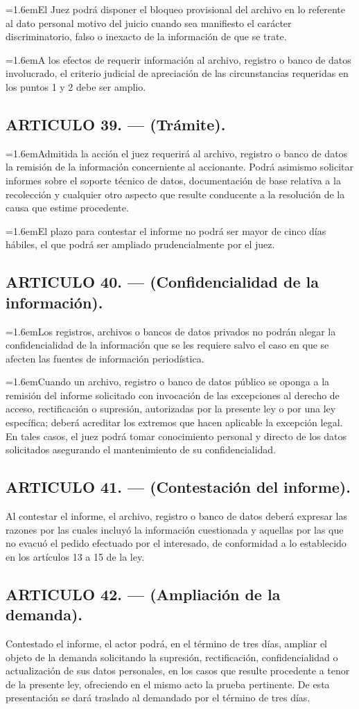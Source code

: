 \documentclass[10pt,a4paper]{article}
\newcommand{\articulo}[1]{\subsection{#1}}
\newcommand{\inciso}[2]{\par{\hangindent=1.6em\hangafter=1\makebox[1.6em][l]{#1}#2\par}}
\begin{document}
\inciso{4.}{El Juez podrá disponer el bloqueo provisional del archivo en lo referente al dato personal motivo del juicio cuando sea manifiesto el carácter discriminatorio, falso o inexacto de la información de que se trate.}

\inciso{5.}{A los efectos de requerir información al archivo, registro o banco de datos involucrado, el criterio judicial de apreciación de las circunstancias requeridas en los puntos 1 y 2 debe ser amplio.}

\articulo{ARTICULO 39. — (Trámite).}
\inciso{1.}{Admitida la acción el juez requerirá al archivo, registro o banco de datos la remisión de la información concerniente al accionante. Podrá asimismo solicitar informes sobre el soporte técnico de datos, documentación de base relativa a la recolección y cualquier otro aspecto que resulte conducente a la resolución de la causa que estime procedente.}

\inciso{2.}{El plazo para contestar el informe no podrá ser mayor de cinco días hábiles, el que podrá ser ampliado prudencialmente por el juez.}

\articulo{ARTICULO 40. — (Confidencialidad de la información).}
\inciso{1.}{Los registros, archivos o bancos de datos privados no podrán alegar la confidencialidad de la información que se les requiere salvo el caso en que se afecten las fuentes de información periodística.}

\inciso{2.}{Cuando un archivo, registro o banco de datos público se oponga a la remisión del informe solicitado con invocación de las excepciones al derecho de acceso, rectificación o supresión, autorizadas por la presente ley o por una ley específica; deberá acreditar los extremos que hacen aplicable la excepción legal. En tales casos, el juez podrá tomar conocimiento personal y directo de los datos solicitados asegurando el mantenimiento de su confidencialidad.}

\articulo{ARTICULO 41. — (Contestación del informe).}
Al contestar el informe, el archivo, registro o banco de datos deberá expresar las razones por las cuales incluyó la información cuestionada y aquellas por las que no evacuó el pedido efectuado por el interesado, de conformidad a lo establecido en los artículos 13 a 15 de la ley.

\articulo{ARTICULO 42. — (Ampliación de la demanda).}
Contestado el informe, el actor podrá, en el término de tres días, ampliar el objeto de la demanda solicitando la supresión, rectificación, confidencialidad o actualización de sus datos personales, en los casos que resulte procedente a tenor de la presente ley, ofreciendo en el mismo acto la prueba pertinente. De esta presentación se dará traslado al demandado por el término de tres días.
\end{document}
